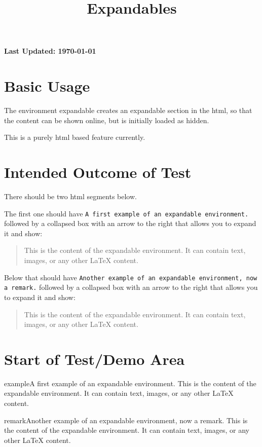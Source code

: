 \documentclass{ximera}
\title{Expandables}
\begin{document}
\begin{abstract}
\end{abstract}
\maketitle

{{\Huge \bfseries Last Updated: \today}} \\

\section{Basic Usage}

The environment expandable creates an expandable section in the html, so that the content can be shown online, but is initially loaded as hidden.

This is a purely html based feature currently.

\section{Intended Outcome of Test}

There should be two html segments below. 

The first one should have \texttt{A first example of an expandable environment.} followed by 
a collapsed box with an arrow to the right that allows you to expand it and show: 
\begin{quote}
This is the content of the expandable environment. It can contain text, images, or any other LaTeX content.
\end{quote}

Below that should have \texttt{Another example of an expandable environment, now a remark.} followed by 
a collapsed box with an arrow to the right that allows you to expand it and show: 
\begin{quote}
This is the content of the expandable environment. It can contain text, images, or any other LaTeX content.
\end{quote}


\section{Start of Test/Demo Area}

\begin{expandable}{example}{A first example of an expandable environment.}
This is the content of the expandable environment. It can contain text, images, or any other LaTeX content.
\end{expandable}

\begin{expandable}{remark}{Another example of an expandable environment, now a remark.}
This is the content of the expandable environment. It can contain text, images, or any other LaTeX content.
\end{expandable}



\hrulefill
\end{document}
